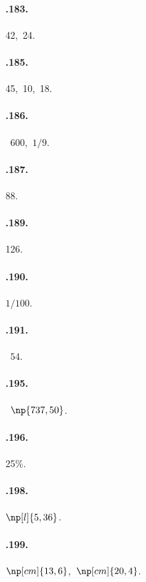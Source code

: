 \begin{multicols}{3}
\paragraph{\thechapter.183.} 42,~24.

\paragraph{\thechapter.185.} 45,~10,~18.

\paragraph{\thechapter.186.} \officialeuro~$600$,~$1/9$.

\paragraph{\thechapter.187.} 88.

\paragraph{\thechapter.189.} 126.

\paragraph{\thechapter.190.} $1/100$.

\paragraph{\thechapter.191.} \officialeuro~$54$.

\paragraph{\thechapter.195.} \officialeuro~$\np{737,50}$.

\paragraph{\thechapter.196.} 25\%.

\paragraph{\thechapter.198.} $\np[l]{5,36}$.

\paragraph{\thechapter.199.} $\np[cm]{13,6}$,~$\np[cm]{20,4}$.


\end{multicols}
